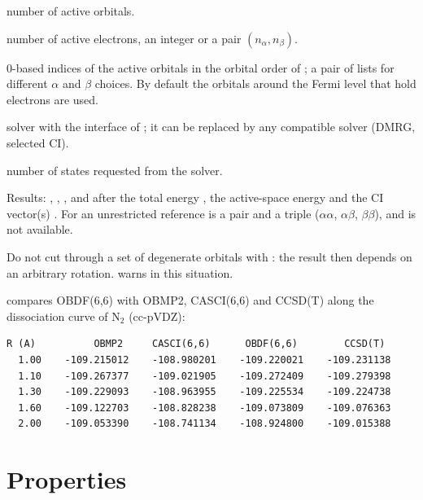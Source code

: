 \begin{description}[style=nextline,leftmargin=3.2cm,labelwidth=3cm]
  \item[\code{ncas}] number of active orbitals.
  \item[\code{nelecas}] number of active electrons, an integer or a pair
        $(n_\alpha, n_\beta)$.
  \item[\code{cas_list}] 0-based indices of the active orbitals in the orbital
        order of ; a pair of lists for different $\alpha$ and
        $\beta$ choices. By default the  orbitals around the Fermi
        level that hold  electrons are used.
  \item[\code{fcisolver}] solver with the interface of ;
        it can be replaced by any compatible solver (DMRG, selected CI).
  \item[\code{nroots}] number of states requested from the solver.
\end{description}

Results: , , , and after
 the total energy , the active-space energy
 and the CI vector(s) . For an unrestricted reference
 is a pair and  a triple ($\alpha\alpha$,
$\alpha\beta$, $\beta\beta$), and  is not available.

Do not cut through a set of degenerate orbitals with : the
result then depends on an arbitrary rotation.  warns in this
situation.

 compares OBDF(6,6) with OBMP2, CASCI(6,6) and
CCSD(T) along the dissociation curve of N$_2$ (cc-pVDZ):

\begin{lstlisting}[style=output]
 R (A)          OBMP2     CASCI(6,6)      OBDF(6,6)        CCSD(T)
  1.00    -109.215012    -108.980201    -109.220021    -109.231138
  1.10    -109.267377    -109.021905    -109.272409    -109.279398
  1.30    -109.229093    -108.963955    -109.225534    -109.224738
  1.60    -109.122703    -108.828238    -109.073809    -109.076363
  2.00    -109.053390    -108.741134    -108.924800    -109.015388
\end{lstlisting}

\section{Properties}
\label{sec:properties}

